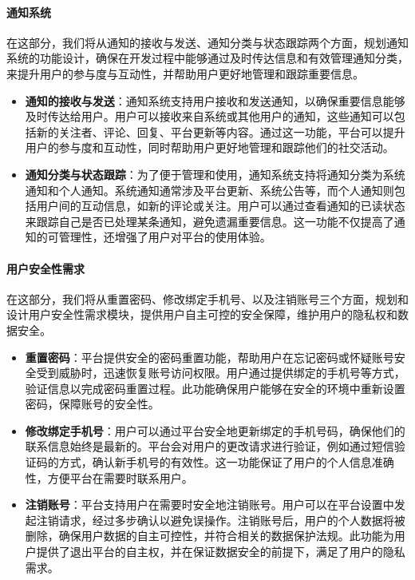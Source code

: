 \paragraph{通知系统}

在这部分，我们将从通知的接收与发送、通知分类与状态跟踪两个方面，规划通知系统的功能设计，确保在开发过程中能够通过及时传达信息和有效管理通知分类，来提升用户的参与度与互动性，并帮助用户更好地管理和跟踪重要信息。

\begin{itemize}
	\item \textbf{通知的接收与发送}：通知系统支持用户接收和发送通知，以确保重要信息能够及时传达给用户。用户可以接收来自系统或其他用户的通知，这些通知可以包括新的关注者、评论、回复、平台更新等内容。通过这一功能，平台可以提升用户的参与度和互动性，同时帮助用户更好地管理和跟踪他们的社交活动。
	\item \textbf{通知分类与状态跟踪}：为了便于管理和使用，通知系统支持将通知分类为系统通知和个人通知。系统通知通常涉及平台更新、系统公告等，而个人通知则包括用户间的互动信息，如新的评论或关注。用户可以通过查看通知的已读状态来跟踪自己是否已处理某条通知，避免遗漏重要信息。这一功能不仅提高了通知的可管理性，还增强了用户对平台的使用体验。
\end{itemize}

\paragraph{用户安全性需求}

在这部分，我们将从重置密码、修改绑定手机号、以及注销账号三个方面，规划和设计用户安全性需求模块，提供用户自主可控的安全保障，维护用户的隐私权和数据安全。

\begin{itemize}
	\item \textbf{重置密码}：平台提供安全的密码重置功能，帮助用户在忘记密码或怀疑账号安全受到威胁时，迅速恢复账号访问权限。用户通过提供绑定的手机号等方式，验证信息以完成密码重置过程。此功能确保用户能够在安全的环境中重新设置密码，保障账号的安全性。
	\item \textbf{修改绑定手机号}：用户可以通过平台安全地更新绑定的手机号码，确保他们的联系信息始终是最新的。平台会对用户的更改请求进行验证，例如通过短信验证码的方式，确认新手机号的有效性。这一功能保证了用户的个人信息准确性，方便平台在需要时联系用户。
	\item \textbf{注销账号}：平台支持用户在需要时安全地注销账号。用户可以在平台设置中发起注销请求，经过多步确认以避免误操作。注销账号后，用户的个人数据将被删除，确保用户数据的自主可控性，并符合相关的数据保护法规。此功能为用户提供了退出平台的自主权，并在保证数据安全的前提下，满足了用户的隐私需求。
\end{itemize}

